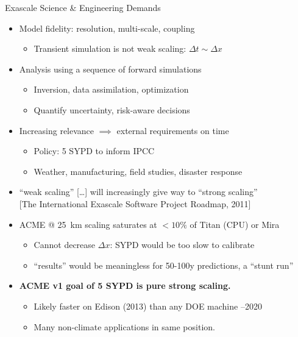 \documentclass{beamer}
\begin{document}
\begin{frame}{Exascale Science \& Engineering Demands}
  \begin{itemize}
  \item Model fidelity: resolution, multi-scale, coupling
    \begin{itemize}
    \item Transient simulation is not weak scaling: $\Delta t \sim \Delta x$
    \end{itemize}
  \item Analysis using a sequence of forward simulations
    \begin{itemize}
    \item Inversion, data assimilation, optimization
    \item Quantify uncertainty, risk-aware decisions
    \end{itemize}
  \item Increasing relevance $\implies$ external requirements on time
    \begin{itemize}
    \item Policy: 5 SYPD to inform IPCC
    \item Weather, manufacturing, field studies, disaster response
    \end{itemize}
  \item ``weak scaling'' [\ldots] will increasingly give way to ``strong scaling''\\
    {\scriptsize [The International Exascale Software Project Roadmap, 2011]}
  \item ACME @ \SI{25}{\kilo\metre} scaling saturates at $<10\%$ of Titan (CPU) or Mira
    \begin{itemize}
    \item Cannot decrease $\Delta x$: SYPD would be too slow to calibrate
    \item ``results'' would be meaningless for 50-100y predictions, a ``stunt run''
    \end{itemize}
  \item \alert{\bf ACME v1 goal of 5 SYPD is pure strong scaling.}
    \begin{itemize}
    \item Likely faster on Edison (2013) than any DOE machine --2020
    \item Many non-climate applications in same position.
    \end{itemize}
  \end{itemize}
\end{frame}
\end{document}
